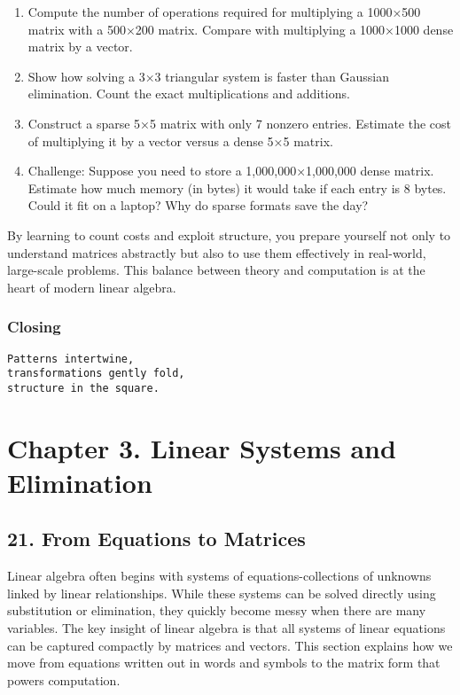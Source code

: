 \documentclass[
  letterpaper,
  DIV=11,
  numbers=noendperiod]{scrreprt}
\providecommand{\tightlist}{%
  \setlength{\itemsep}{0pt}\setlength{\parskip}{0pt}}
\begin{document}
\begin{enumerate}
\def\labelenumi{\arabic{enumi}.}
\tightlist
\item
  Compute the number of operations required for multiplying a 1000×500
  matrix with a 500×200 matrix. Compare with multiplying a 1000×1000
  dense matrix by a vector.
\item
  Show how solving a 3×3 triangular system is faster than Gaussian
  elimination. Count the exact multiplications and additions.
\item
  Construct a sparse 5×5 matrix with only 7 nonzero entries. Estimate
  the cost of multiplying it by a vector versus a dense 5×5 matrix.
\item
  Challenge: Suppose you need to store a 1,000,000×1,000,000 dense
  matrix. Estimate how much memory (in bytes) it would take if each
  entry is 8 bytes. Could it fit on a laptop? Why do sparse formats save
  the day?
\end{enumerate}

By learning to count costs and exploit structure, you prepare yourself
not only to understand matrices abstractly but also to use them
effectively in real-world, large-scale problems. This balance between
theory and computation is at the heart of modern linear algebra.

\subsubsection{Closing}\label{closing-1}

\begin{verbatim}
Patterns intertwine,
transformations gently fold,
structure in the square.
\end{verbatim}

\section{Chapter 3. Linear Systems and
Elimination}\label{chapter-3.-linear-systems-and-elimination-1}

\subsection{21. From Equations to
Matrices}\label{from-equations-to-matrices}

Linear algebra often begins with systems of equations-collections of
unknowns linked by linear relationships. While these systems can be
solved directly using substitution or elimination, they quickly become
messy when there are many variables. The key insight of linear algebra
is that all systems of linear equations can be captured compactly by
matrices and vectors. This section explains how we move from equations
written out in words and symbols to the matrix form that powers
computation.
\end{document}
